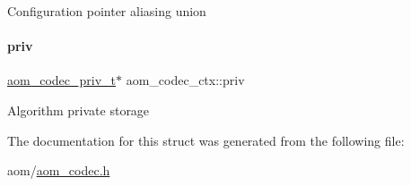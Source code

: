 Configuration pointer aliasing union \mbox{\label{structaom__codec__ctx_a9bd533e9da28ce73c8b787d4359ed337}} 
\paragraph{\texorpdfstring{priv}{priv}}
{\footnotesize\ttfamily \hyperlink{group__codec_ga3671963ca4b3d6c2adbc186c8ed18023}{aom\+\_\+codec\+\_\+priv\+\_\+t}$\ast$ aom\+\_\+codec\+\_\+ctx\+::priv}

Algorithm private storage 

The documentation for this struct was generated from the following file\+:\begin{DoxyCompactItemize}
\item 
aom/\hyperlink{aom__codec_8h}{aom\+\_\+codec.\+h}\end{DoxyCompactItemize}
